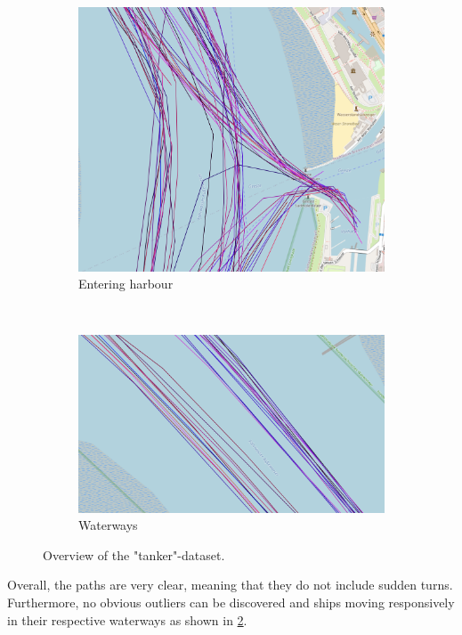 \begin{figure}[H]
\begin{minipage}{.45\linewidth}
\begin{subfigure}[t]{.9\linewidth}
            \includegraphics[width=\textwidth]{images/ais/tracks/tanker_partial.png}
            \caption{Entering harbour}
            \label{fig:tankerEntering}
        \end{subfigure} \\
        \begin{subfigure}[b]{.9\linewidth}
            \includegraphics[width=\textwidth]{images/ais/tracks/tanker_fahrrinnen.png}
            \caption{Waterways}
            \label{fig:tankerWaterway}
        \end{subfigure} 
    \end{minipage}
    \caption{Overview of the "tanker"-dataset.}
    \label{fig:tankerTracks}
\end{figure}
Overall, the paths are very clear, meaning that they do not include sudden turns. Furthermore, no obvious outliers can be discovered and ships moving responsively in their respective waterways as shown in \ref{fig:tankerWaterway}.


